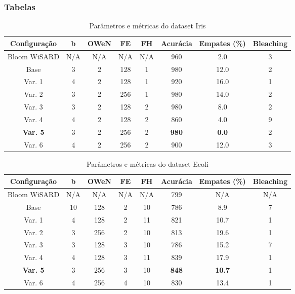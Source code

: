 \documentclass{article}
\begin{document}
\subsubsection{Tabelas}

{\small
\begin{table}[H]
\caption{Parâmetros e métricas do dataset Iris}
\begin{tabular}{|c|c|c|c|c|c|c|c|}
\hline
\textbf{Configuração} & \textbf{b} & \textbf{OWeN} & \textbf{FE} & \textbf{FH} & \textbf{Acurácia} & \textbf{Empates (\%)} & \textbf{Bleaching} \\
\hline
Bloom WiSARD & N/A & N/A & N/A & N/A & 960 & 2.0 & 3 \\
\hline
Base & 3 & 2 & 128 & 1 & 980 & 12.0 & 2 \\
\hline
Var. 1 & 4 & 2 & 128 & 1 & 920 & 16.0 & 1 \\
\hline
Var. 2 & 3 & 2 & 256 & 1 & 980 & 14.0 & 2 \\
\hline
Var. 3 & 3 & 2 & 128 & 2 & 980 & 8.0 & 2 \\
\hline
Var. 4 & 4 & 2 & 128 & 2 & 860 & 4.0 & 9 \\
\hline
\textbf{Var. 5} & 3 & 2 & 256 & 2 & \textbf{980} & \textbf{0.0} & 2 \\
\hline
Var. 6 & 4 & 2 & 256 & 2 & 900 & 12.0 & 3 \\
\hline
\end{tabular}
\end{table}

\begin{table}[H]
\caption{Parâmetros e métricas do dataset Ecoli}
\begin{tabular}{|c|c|c|c|c|c|c|c|}
\hline
\textbf{Configuração} & \textbf{b} & \textbf{OWeN} & \textbf{FE} & \textbf{FH} & \textbf{Acurácia} & \textbf{Empates (\%)} & \textbf{Bleaching} \\
\hline
Bloom WiSARD & N/A & N/A & N/A & N/A & 799 & N/A & N/A \\
\hline
Base & 10 & 128 & 2 & 10 & 786 & 8.9 & 7 \\
\hline
Var. 1 & 4 & 128 & 2 & 11 & 821 & 10.7 & 1 \\
\hline
Var. 2 & 3 & 256 & 2 & 10 & 813 & 19.6 & 1 \\
\hline
Var. 3 & 3 & 128 & 3 & 10 & 786 & 15.2 & 7 \\
\hline
Var. 4 & 4 & 128 & 3 & 11 & 839 & 17.9 & 1 \\
\hline
\textbf{Var. 5} & 3 & 256 & 3 & 10 & \textbf{848} & \textbf{10.7} & 1 \\
\hline
Var. 6 & 4 & 256 & 4 & 10 & 830 & 13.4 & 1 \\
\hline
\end{tabular}
\end{table}

}
\end{document}
